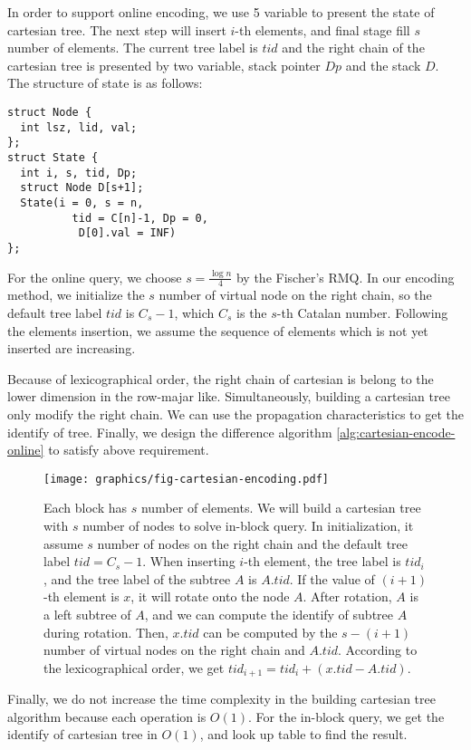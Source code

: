 

In order to support online encoding, we use 5 variable to present the
state of cartesian tree.  The next step will insert $i$-th elements,
and final stage fill $s$ number of elements.  The current tree label
is $\mathit{tid}$ and the right chain of the cartesian tree is
presented by two variable, stack pointer $\mathit{Dp}$ and the stack
$\mathit{D}$. The structure of state is as follows:

\begin{minipage}{0.9\linewidth}
\begin{lstlisting}[frame=single,caption=State of Cartesian Tree]
struct Node {
  int lsz, lid, val;
};
struct State {
  int i, s, tid, Dp;
  struct Node D[s+1];
  State(i = 0, s = n, 
          tid = C[n]-1, Dp = 0,
           D[0].val = INF)
};
\end{lstlisting}
\end{minipage}

For the online query, we choose $s=\frac{\log n}{4}$ by the Fischer's
RMQ.  In our encoding method, we initialize the $s$ number of virtual
node on the right chain, so the default tree label $\mathit{tid}$ is
$C_s - 1$, which $C_s$ is the $s$-th Catalan number.  Following the
elements insertion, we assume the sequence of elements which is not
yet inserted are increasing.

Because of lexicographical order, the right chain of cartesian is
belong to the lower dimension in the row-majar like.  Simultaneously,
building a cartesian tree only modify the right chain.  We can use the
propagation characteristics to get the identify of tree.  Finally, we
design the difference algorithm \ref{alg:cartesian-encode-online} to
satisfy above requirement.



\begin{figure*}[!thb]
  \centering
  \texttt{[image: graphics/fig-cartesian-encoding.pdf]}

  \caption{  
Each block has $s$ number of elements.  We will build a
cartesian tree with $s$ number of nodes to solve in-block query.  In
initialization, it assume $s$ number of nodes on the right chain and
the default tree label $\mathit{tid} = C_s - 1$.  When inserting
$i$-th element, the tree label is $\mathit{tid}_i$, and the tree label
of the subtree $A$ is $A.\mathit{tid}$.  If the value of $(i+1)$-th
element is $x$, it will rotate onto the node $A$.  After rotation, $A$
is a left subtree of $A$, and we can compute the identify of subtree
$A$ during rotation.  Then, $x.\mathit{tid}$ can be computed by the
$s-(i+1)$ number of virtual nodes on the right chain and
$A.\mathit{tid}$.  According to the lexicographical order, we get
$\mathit{tid}_{i+1} = \mathit{tid}_i + (x.\mathit{tid} -
A.\mathit{tid})$. 
}

  \label{fig:cartesianEncoding}
\end{figure*}

Finally, we do not increase the time complexity in the building
cartesian tree algorithm because each operation is $O(1)$.  For the
in-block query, we get the identify of cartesian tree in $O(1)$, and
look up table to find the result.




